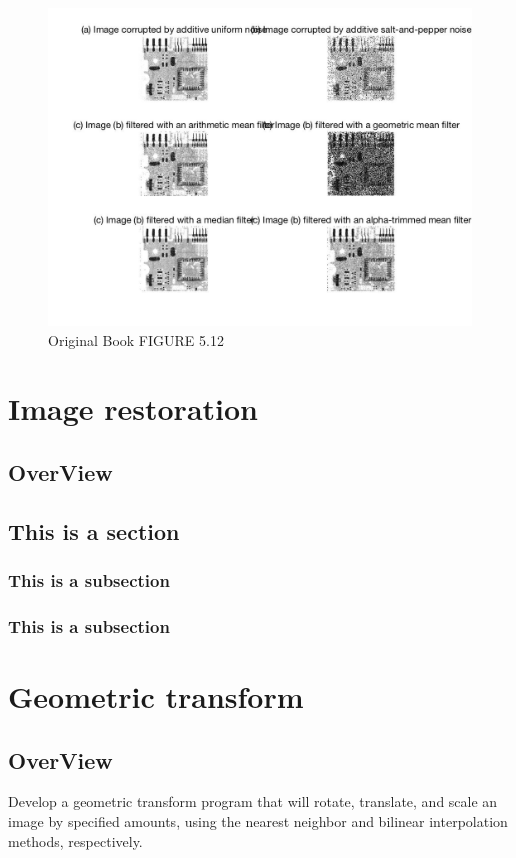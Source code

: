 \documentclass[11pt,oneside]{book}
\begin{document}
\begin{figure}[!htb]
   \centering  
   \includegraphics[width=1.0\textwidth]{images/4/order3.jpg}
   \caption{Original Book FIGURE 5.12}
\end{figure}
\newpage
\chapter{Image restoration}
\section{OverView}


\section{This is a section}
\subsection{This is a subsection}
\subsection{This is a subsection}



\chapter{Geometric transform}
\section{OverView}
Develop a geometric transform program that will rotate, translate, and scale an image by specified amounts, using the nearest neighbor and bilinear interpolation methods, respectively.
\end{document}
